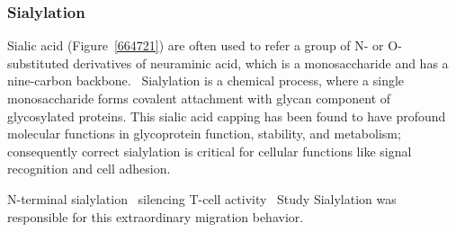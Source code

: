 \subsubsection {Sialylation}
Sialic acid (Figure~\ref{664721}) are often used to refer a group of N- or O-substituted derivatives of neuraminic acid, which is a monosaccharide and has a nine-carbon backbone.~\cite{Vocadlo_2009} Sialylation is a chemical process, where a single monosaccharide forms covalent attachment with glycan component of glycosylated proteins. This sialic acid capping has been found to have profound molecular functions in glycoprotein function, stability, and metabolism; consequently correct sialylation is critical for cellular functions like signal recognition and cell adhesion.~\cite{Bhide_2016}
\par 
N-terminal sialylation~\cite{Stehling_1999}
silencing T-cell activity~\cite{K_hne_1996} 
Study Sialylation was responsible for this extraordinary migration behavior.